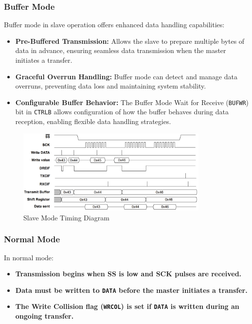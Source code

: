 \subsubsection{Buffer Mode}
Buffer mode in slave operation offers enhanced data handling capabilities:

\begin{itemize}
    \item \textbf{Pre-Buffered Transmission:} Allows the slave to prepare multiple bytes of data in advance, ensuring seamless data transmission when the master initiates a transfer.
    \item \textbf{Graceful Overrun Handling:} Buffer mode can detect and manage data overruns, preventing data loss and maintaining system stability.
    \item \textbf{Configurable Buffer Behavior:} The Buffer Mode Wait for Receive (\texttt{BUFWR}) bit in \texttt{CTRLB} allows configuration of how the buffer behaves during data reception, enabling flexible data handling strategies.
\end{itemize}

\begin{figure}[H]
    \centering
    \includegraphics[width=0.85\textwidth]{images/spi_slave_timing.png}
    \caption{Slave Mode Timing Diagram}
    \label{fig:spi_slave_timing}
\end{figure}

\subsubsection{Normal Mode}
In normal mode:

\begin{itemize}
    \item \textbf{Transmission begins when SS is low and SCK pulses are received.}
    \item \textbf{Data must be written to \texttt{DATA} before the master initiates a transfer.}
    \item \textbf{The Write Collision flag (\texttt{WRCOL}) is set if \texttt{DATA} is written during an ongoing transfer.}
\end{itemize}

